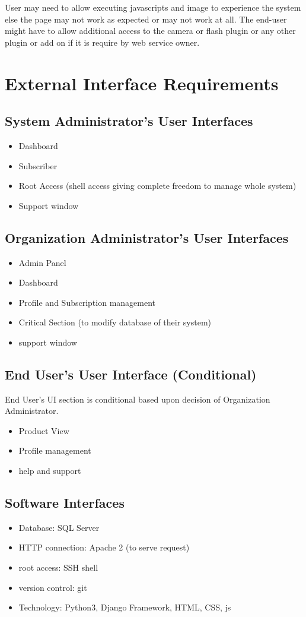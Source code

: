 \documentclass{report}
\def\superuser{System Administrator}
\def\admin{Organization Administrator}
\def\user{End User}
\begin{document}
User may need to allow executing javascripts and image to experience the system else the page may not work as expected or may not work at all.
The end-user might have to allow additional access to the camera or flash plugin or any other plugin or add on if it is require by web service owner.
 

\chapter{External Interface Requirements}
\section{\superuser's User Interfaces}
\begin{itemize}
	\item Dashboard 
	\item Subscriber
	\item Root Access (shell access giving complete freedom to manage whole system)
	\item Support window
\end{itemize}

\section{\admin's User Interfaces}
\begin{itemize}
	\item Admin Panel
	\item Dashboard
	\item Profile and Subscription management
	\item Critical Section (to modify database of their system)
	\item support window
\end{itemize}

\section{\user's User Interface (Conditional)}
\space \user's UI section is conditional based upon decision of \admin.
\begin{itemize}
	\item Product View
	\item Profile management
	\item help and support
\end{itemize}

\section{Software Interfaces}
\begin{itemize}
	\item Database: SQL Server
	\item HTTP connection: Apache 2 (to serve request)
	\item root access: SSH shell
	\item version control: git
	\item Technology: Python3, Django Framework, HTML, CSS, js
\end{itemize}
\end{document}

